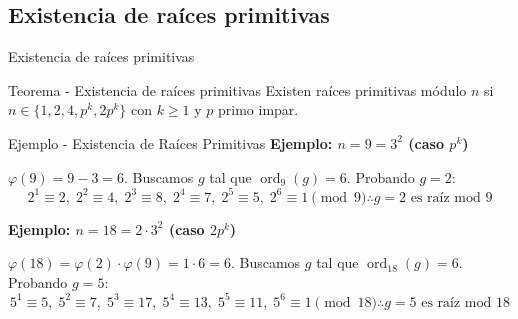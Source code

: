 \documentclass[aspectratio=169]{beamer}
\begin{document}
\subsection{Existencia de raíces primitivas}
\begin{frame}{Existencia de raíces primitivas}



\begin{alertblock}{Teorema - Existencia de raíces primitivas}
Existen raíces primitivas módulo $n$ si  $n \in \{1,2,4,p^k,2p^k\}$ con $k \ge 1$ y $p$ primo impar.
\end{alertblock}
\begin{exampleblock}{Ejemplo - Existencia de Raíces Primitivas}
\textbf{Ejemplo: $n=9=3^2$ (caso $p^k$)}

$\varphi(9)=9-3=6$. Buscamos $g$ tal que $\operatorname{ord}_9(g)=6$. Probando $g=2$:
\[
2^1\equiv2,\; 2^2\equiv4,\; 2^3\equiv8,\; 2^4\equiv7,\; 2^5\equiv5,\; 2^6\equiv1 \pmod9 \therefore  g = 2 \text{ es raíz mod } 9
\]

\textbf{Ejemplo: $n=18=2\cdot3^2$ (caso $2p^k$)}

$\varphi(18)=\varphi(2)\cdot\varphi(9)=1\cdot6=6$. Buscamos $g$ tal que $\operatorname{ord}_{18}(g)=6$. Probando $g=5$:
\[
5^1\equiv5,\; 5^2\equiv7,\; 5^3\equiv17,\; 5^4\equiv13,\; 5^5\equiv11,\; 5^6\equiv1 \pmod{18} \therefore  g = 5 \text{ es raíz mod } 18
\]

\end{exampleblock}

\end{frame}
\end{document}

